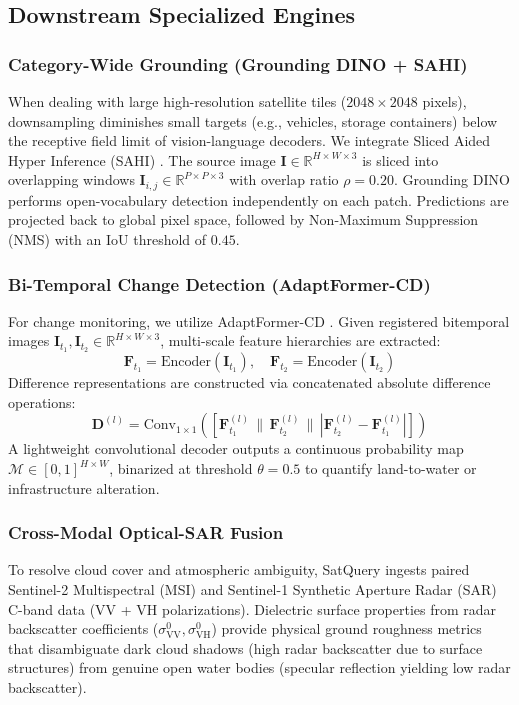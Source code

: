 \documentclass[lettersize,journal]{IEEEtran}
\begin{document}
\subsection{Downstream Specialized Engines}
\subsubsection{Category-Wide Grounding (Grounding DINO + SAHI)}
When dealing with large high-resolution satellite tiles ($2048 \times 2048$ pixels), downsampling diminishes small targets (e.g., vehicles, storage containers) below the receptive field limit of vision-language decoders. We integrate Sliced Aided Hyper Inference (SAHI) \cite{akyon2022sahi}. The source image $\mathbf{I} \in \mathbb{R}^{H \times W \times 3}$ is sliced into overlapping windows $\mathbf{I}_{i,j} \in \mathbb{R}^{P \times P \times 3}$ with overlap ratio $\rho = 0.20$. Grounding DINO \cite{liu2023groundingdino} performs open-vocabulary detection independently on each patch. Predictions are projected back to global pixel space, followed by Non-Maximum Suppression (NMS) with an IoU threshold of $0.45$.

\subsubsection{Bi-Temporal Change Detection (AdaptFormer-CD)}
For change monitoring, we utilize AdaptFormer-CD \cite{chen2023adaptformer}. Given registered bitemporal images $\mathbf{I}_{t_1}, \mathbf{I}_{t_2} \in \mathbb{R}^{H \times W \times 3}$, multi-scale feature hierarchies are extracted:
\begin{equation}
\mathbf{F}_{t_1} = \text{Encoder}(\mathbf{I}_{t_1}), \quad \mathbf{F}_{t_2} = \text{Encoder}(\mathbf{I}_{t_2})
\end{equation}
Difference representations are constructed via concatenated absolute difference operations:
\begin{equation}
\mathbf{D}^{(l)} = \text{Conv}_{1 \times 1}\left(\left[\mathbf{F}_{t_1}^{(l)} \,\|\, \mathbf{F}_{t_2}^{(l)} \,\|\, |\mathbf{F}_{t_2}^{(l)} - \mathbf{F}_{t_1}^{(l)}|\right]\right)
\end{equation}
A lightweight convolutional decoder outputs a continuous probability map $\mathcal{M} \in [0, 1]^{H \times W}$, binarized at threshold $\theta = 0.5$ to quantify land-to-water or infrastructure alteration.

\subsubsection{Cross-Modal Optical-SAR Fusion}
To resolve cloud cover and atmospheric ambiguity, SatQuery ingests paired Sentinel-2 Multispectral (MSI) and Sentinel-1 Synthetic Aperture Radar (SAR) C-band data (VV + VH polarizations). Dielectric surface properties from radar backscatter coefficients ($\sigma_{\text{VV}}^0, \sigma_{\text{VH}}^0$) provide physical ground roughness metrics that disambiguate dark cloud shadows (high radar backscatter due to surface structures) from genuine open water bodies (specular reflection yielding low radar backscatter).
\end{document}

